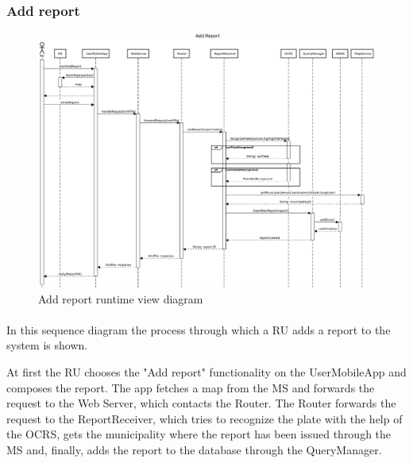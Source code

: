 				\subsubsection{Add report}
					\begin{figure}[!h]
						\centering
						\includegraphics[width=\textwidth]{images/DD2/RuntimeView/RU/AddReport.pdf}
						\caption{Add report runtime view diagram}
					\end{figure}
					\paragraph{}
						In this sequence diagram the process through which a RU adds a report to the system is shown. 
						
						At first the RU chooses the "Add report" functionality on the UserMobileApp and composes the report. The app fetches a map from the MS and forwards the request to the Web Server, which contacts the Router. The Router forwards the request to the ReportReceiver, which tries to recognize the plate with the help of the OCRS, gets the municipality where the report has been issued through the MS and, finally, adds the report to the database through the QueryManager.
